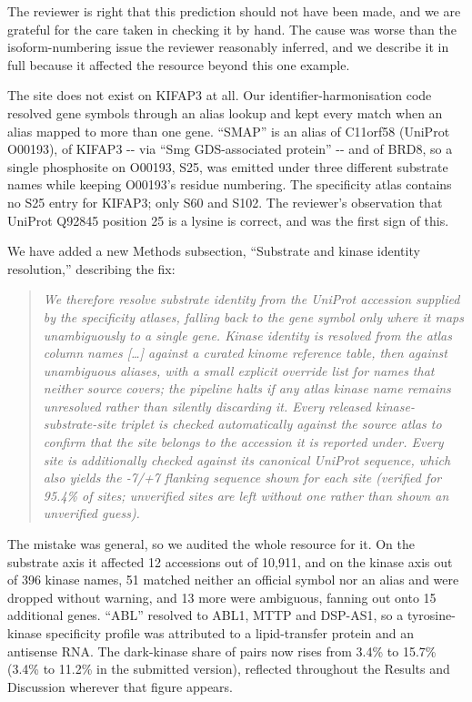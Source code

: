 \documentclass[
]{article}
\begin{document}
The reviewer is right that this prediction should not have been made,
and we are grateful for the care taken in checking it by hand. The cause
was worse than the isoform-numbering issue the reviewer reasonably
inferred, and we describe it in full because it affected the resource
beyond this one example.

The site does not exist on KIFAP3 at all. Our identifier-harmonisation
code resolved gene symbols through an alias lookup and kept every match
when an alias mapped to more than one gene. ``SMAP'' is an alias of
C11orf58 (UniProt O00193), of KIFAP3 -\/- via ``Smg GDS-associated
protein'' -\/- and of BRD8, so a single phosphosite on O00193, S25, was
emitted under three different substrate names while keeping O00193's
residue numbering. The specificity atlas contains no S25 entry for
KIFAP3; only S60 and S102. The reviewer's observation that UniProt
Q92845 position 25 is a lysine is correct, and was the first sign of
this.

We have added a new Methods subsection, ``Substrate and kinase identity
resolution,'' describing the fix:

\begin{quote}
\emph{We therefore resolve substrate identity from the UniProt accession
supplied by the specificity atlases, falling back to the gene symbol
only where it maps unambiguously to a single gene. Kinase identity is
resolved from the atlas column names {[}\ldots{]} against a curated
kinome reference table, then against unambiguous aliases, with a small
explicit override list for names that neither source covers; the
pipeline halts if any atlas kinase name remains unresolved rather than
silently discarding it. Every released kinase-substrate-site triplet is
checked automatically against the source atlas to confirm that the site
belongs to the accession it is reported under. Every site is
additionally checked against its canonical UniProt sequence, which also
yields the -7/+7 flanking sequence shown for each site (verified for
95.4\% of sites; unverified sites are left without one rather than shown
an unverified guess).}
\end{quote}

The mistake was general, so we audited the whole resource for it. On the
substrate axis it affected 12 accessions out of 10,911, and on the
kinase axis out of 396 kinase names, 51 matched neither an official
symbol nor an alias and were dropped without warning, and 13 more were
ambiguous, fanning out onto 15 additional genes. ``ABL'' resolved to
ABL1, MTTP and DSP-AS1, so a tyrosine-kinase specificity profile was
attributed to a lipid-transfer protein and an antisense RNA. The
dark-kinase share of pairs now rises from 3.4\% to 15.7\% (3.4\% to
11.2\% in the submitted version), reflected throughout the Results and
Discussion wherever that figure appears.
\end{document}
